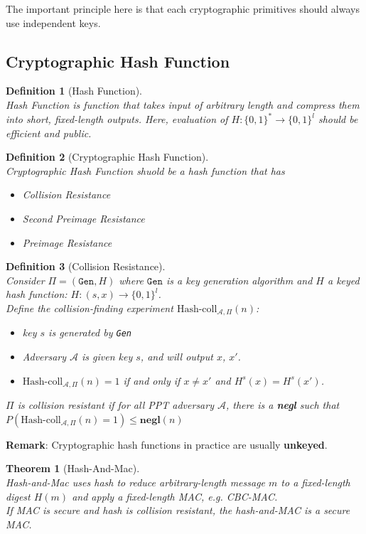 \documentclass[12pt]{article}
\newtheorem{definition}{Definition}[section]
\newtheorem{theorem}{Theorem}[section]
\theoremstyle{definition}
\begin{document}
The important principle here is that each cryptographic primitives should always use independent keys.
\subsection{Cryptographic Hash Function}
\begin{definition}[Hash Function]
\hfill\\\normalfont Hash Function is function that takes input of arbitrary length and compress them into short, fixed-length outputs. Here, evaluation of $H:\{0,1\}^\ast\to\{0,1\}^l$ should be efficient and public.
\end{definition}
\begin{definition}[Cryptographic Hash Function]
\hfill\\\normalfont Cryptographic Hash Function shuold be a hash function that has
\begin{itemize}
  \item Collision Resistance
  \item Second Preimage Resistance
  \item Preimage Resistance
\end{itemize}
\end{definition}
\begin{definition}[Collision Resistance]
\hfill\\\normalfont Consider $\Pi=(\texttt{Gen}, H)$ where $\texttt{Gen}$ is a key generation algorithm and $H$ a keyed hash function: $H:(s, x)\to \{0,1\}^l$.\\
Define the collision-finding experiment $\text{Hash-coll}_{\mathcal{A},\Pi}(n)$:
\begin{itemize}
  \item key $s$ is generated by \texttt{Gen}
  \item Adversary $\mathcal{A}$ is given key $s$, and will output $x$, $x'$.
  \item $\text{Hash-coll}_{\mathcal{A},\Pi}(n)=1$ if and only if $x\neq x'$ and $H^s(x)=H^s(x')$.
\end{itemize}
$\Pi$ is collision resistant if for all PPT adversary $\mathcal{A}$, there is a \textbf{negl} such that 
$
P(\text{Hash-coll}_{\mathcal{A},\Pi}(n)=1)\leq \textbf{negl}(n)
$
\end{definition}
\textbf{Remark}: Cryptographic hash functions in practice are usually \textbf{unkeyed}.
\begin{theorem}[Hash-And-Mac]
\hfill\\\normalfont Hash-and-Mac uses hash to reduce arbitrary-length message $m$ to a fixed-length digest $H(m)$ and apply a fixed-length MAC, e.g. CBC-MAC.\\
If MAC is secure and hash is collision resistant, the hash-and-MAC is a secure MAC.
\end{theorem}
\end{document}
